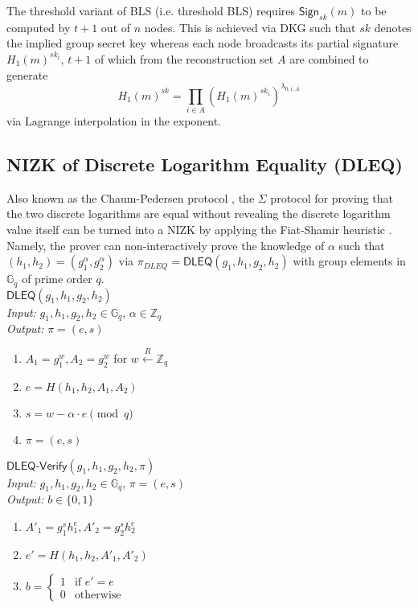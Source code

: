\documentclass[letterpaper,twocolumn,10pt]{article}
\theoremstyle{definition}
\theoremstyle{remark}
\begin{document}
The threshold variant \cite{boldyreva2003threshold} of BLS (i.e. threshold BLS) requires $\mathsf{Sign}_{sk}(m)$ to be computed by $t + 1$ out of $n$ nodes. This is achieved via DKG such that $sk$ denotes the implied group secret key whereas each node broadcasts its partial signature $H_1(m)^{sk_i}$, $t + 1$ of which from the reconstruction set $A$ are combined to generate
\[
H_1(m)^{sk} = \prod_{i \in A} \left(H_1(m)^{sk_i}\right)^{\lambda_{0, i, A}}
\]
via Lagrange interpolation in the exponent.

\subsection{NIZK of Discrete Logarithm Equality (DLEQ)}
\label{appendix:dleq}
Also known as the Chaum-Pedersen protocol \cite{chaum1992wallet}, the $\Sigma$ protocol for proving that the two discrete logarithms are equal without revealing the discrete logarithm value itself can be turned into a NIZK by applying the Fiat-Shamir heuristic \cite{fiat1986prove}. Namely, the prover can non-interactively prove the knowledge of $\alpha$ such that $(h_1, h_2) = (g_1^\alpha, g_2^\alpha)$ via $\pi_{DLEQ} = \mathsf{DLEQ}(g_1, h_1, g_2, h_2)$ with group elements in $\mathbb{G}_q$ of prime order $q$.\\

\noindent\underline{$\mathsf{DLEQ}(g_1, h_1, g_2, h_2)$}\\
\textit{Input:} $g_1, h_1, g_2, h_2 \in \mathbb{G}_q$, $\alpha \in \mathbb{Z}_q$\\
\textit{Output:} $\pi = (e, s)$
\begin{enumerate}
\item $A_1 = g_1^w, A_2 = g_2^w$ for $w \xleftarrow{R} \mathbb{Z}_q$
\item $e = H(h_1, h_2, A_1, A_2)$
\item $s = w - \alpha \cdot e \pmod q$
\item $\pi = (e, s)$
\end{enumerate}

\noindent\underline{$\mathsf{DLEQ}\text{-}\mathsf{Verify}(g_1, h_1, g_2, h_2, \pi)$}\\
\textit{Input:} $g_1, h_1, g_2, h_2 \in \mathbb{G}_q$, $\pi = (e, s)$\\
\textit{Output:} $b \in \{0, 1\}$
\begin{enumerate}
\item $A'_1 = g_1^s h_1^e, A'_2 = g_2^s h_2^e$
\item $e' = H(h_1, h_2, A'_1, A'_2)$
\item $b = \begin{cases}
1 & \text{if $e' = e$}\\
0 & \text{otherwise}
\end{cases}$
\end{enumerate}
\end{document}
